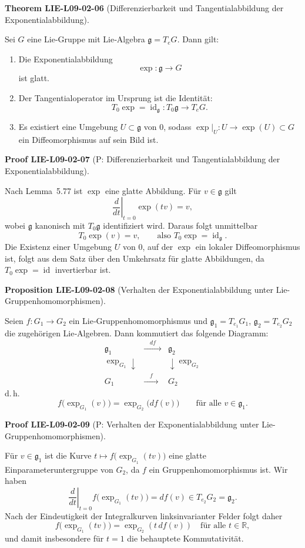 \documentclass[10pt, letterpaper]{article}
\newcommand{\CustomHeading}[3]{%
  \par\medskip\noindent%
  \textbf{#1 #2} \textnormal{(#3)}.\enskip%
}
\newenvironment{PROP}[2]{\CustomHeading{Proposition}{#1}{#2}}{}
\newenvironment{THEO}[2]{\CustomHeading{Theorem}{#1}{#2}}{}
\newenvironment{PROOF}[2]{\CustomHeading{Proof}{#1}{#2}}{}
\begin{document}
\begin{THEO}{LIE-L09-02-06}{Differenzierbarkeit und Tangentialabbildung der Exponentialabbildung}
Sei $G$ eine Lie‐Gruppe mit Lie‐Algebra $\mathfrak g=T_eG$.
Dann gilt:
\begin{enumerate}
\item Die Exponentialabbildung
\[
\exp:\mathfrak g\longrightarrow G
\]
ist glatt.
\item Der Tangentialoperator im Ursprung ist die Identität:
\[
T_0\exp=\operatorname{id}_{\mathfrak g}:T_0\mathfrak g\longrightarrow T_eG.
\]
\item Es existiert eine Umgebung $U\subset\mathfrak g$ von $0$, sodass
$\exp|_U:U\to \exp(U)\subset G$ ein Diffeomorphismus auf sein Bild ist.
\end{enumerate}
\end{THEO}

\begin{PROOF}{LIE-L09-02-07}{P: Differenzierbarkeit und Tangentialabbildung der Exponentialabbildung}
Nach Lemma~5.77 ist $\exp$ eine glatte Abbildung.
Für $v\in\mathfrak g$ gilt
\[
\left.\frac{d}{dt}\right|_{t=0}\exp(tv)=v,
\]
wobei $\mathfrak g$ kanonisch mit $T_0\mathfrak g$ identifiziert wird.
Daraus folgt unmittelbar
\[
T_0\exp(v)=v,\qquad \text{also }T_0\exp=\operatorname{id}_{\mathfrak g}.
\]
Die Existenz einer Umgebung $U$ von $0$, auf der $\exp$ ein lokaler Diffeomorphismus
ist, folgt aus dem Satz über den Umkehrsatz für glatte Abbildungen, da
$T_0\exp=\operatorname{id}$ invertierbar ist.
\end{PROOF}

\begin{PROP}{LIE-L09-02-08}{Verhalten der Exponentialabbildung unter Lie-Gruppenhomomorphismen}
Seien $f:G_1\to G_2$ ein Lie‐Gruppenhomomorphismus und
$\mathfrak g_1=T_{e_1}G_1$, $\mathfrak g_2=T_{e_2}G_2$ die zugehörigen Lie‐Algebren.
Dann kommutiert das folgende Diagramm:
\[
\begin{array}{ccc}
\mathfrak g_1 & \xrightarrow{\quad df\quad} & \mathfrak g_2 \\[6pt]
\exp_{G_1}\!\!\downarrow &  & \downarrow\!\!\exp_{G_2}\\[6pt]
G_1 & \xrightarrow{\quad f\quad} & G_2
\end{array}
\]
d.\,h.
\[
f\bigl(\exp_{G_1}(v)\bigr)=\exp_{G_2}\bigl(df(v)\bigr)
\qquad\text{für alle }v\in\mathfrak g_1.
\]
\end{PROP}

\begin{PROOF}{LIE-L09-02-09}{P: Verhalten der Exponentialabbildung unter Lie-Gruppenhomomorphismen}
Für $v\in\mathfrak g_1$ ist die Kurve
$t\mapsto f\bigl(\exp_{G_1}(t v)\bigr)$ eine glatte Einparameteruntergruppe von $G_2$,
da $f$ ein Gruppenhomomorphismus ist.
Wir haben
\[
\left.\frac{d}{dt}\right|_{t=0}f\bigl(\exp_{G_1}(t v)\bigr)
=df(v)\in T_{e_2}G_2=\mathfrak g_2.
\]
Nach der Eindeutigkeit der Integralkurven linksinvarianter Felder folgt daher
\[
f\bigl(\exp_{G_1}(t v)\bigr)=\exp_{G_2}(t\,df(v))
\quad\text{für alle }t\in\mathbb R,
\]
und damit insbesondere für $t=1$ die behauptete Kommutativität.
\end{PROOF}
\end{document}
